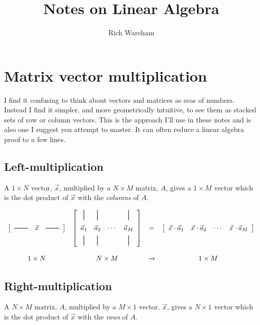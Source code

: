 \documentclass[a4paper]{article}
\title{Notes on Linear Algebra}
\author{Rich Wareham}
\newcommand{\hmatrixrule}{\rule[0.5ex]{2em}{0.7pt}}
\newcommand{\vmatrixrule}{\rule[-0.5ex]{0.7pt}{1.5em}}
\begin{document}
\maketitle

\section{Matrix vector multiplication}

I find it confusing to think about vectors and matrices as seas of numbers.
Instead I find it simpler, and more geometrically intuitive, to see them as
stacked sets of row or column vectors. This is the approach I'll use in these
notes and is also one I suggest you attempt to master. It can often reduce a
linear algebra proof to a few lines.

\subsection{Left-multiplication}

A $1 \times N$ vector, $\vec{x}$, multiplied by a $N \times M$ matrix, $A$,
gives a $1 \times M$ vector which is the dot product of $\vec{x}$ with the
\emph{columns} of $A$.

\[
\begin{array}{cccc}
\left[
  \begin{array}{cccc}
    \hmatrixrule & \vec{x} & \hmatrixrule 
  \end{array} \right] &
\left[
	\begin{array}{cccc}
		\vmatrixrule & \vmatrixrule &  & \vmatrixrule \\[1ex]
		\vec{a}_1 & \vec{a}_2 & \cdots & \vec{a}_M \\[1ex]
		\vmatrixrule & \vmatrixrule &  & \vmatrixrule 
	\end{array}
\right] &
= &
\left[ \begin{array}{cccc}
	\vec{x} \cdot \vec{a}_1 & \vec{x} \cdot \vec{a}_2 & \cdots & \vec{x} \cdot \vec{a}_M
      \end{array} \right] 
\\
\rule{0pt}{2em} 1 \times N & N \times M & \rightarrow & 1 \times M
\end{array}
\]

\subsection{Right-multiplication}

A $N \times M$ matrix, $A$, multiplied by a $M \times 1$ vector, $\vec{x}$,
gives a $N \times 1$ vector which is the dot product of $\vec{x}$ with the
\emph{rows} of $A$.
\end{document}
